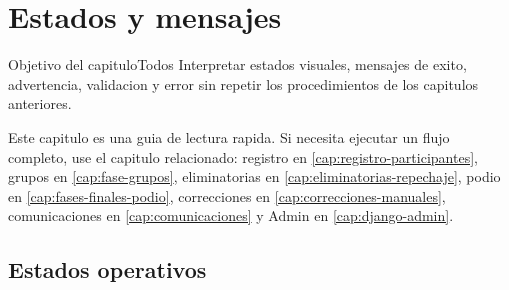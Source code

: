 \chapter{Estados y mensajes}
\label{cap:estados-mensajes}

\begin{procedimiento}{Objetivo del capitulo}{Todos}
Interpretar estados visuales, mensajes de exito, advertencia, validacion y error sin repetir los procedimientos de los capitulos anteriores.
\end{procedimiento}

Este capitulo es una guia de lectura rapida. Si necesita ejecutar un flujo completo, use el capitulo relacionado: registro en \cref{cap:registro-participantes}, grupos en \cref{cap:fase-grupos}, eliminatorias en \cref{cap:eliminatorias-repechaje}, podio en \cref{cap:fases-finales-podio}, correcciones en \cref{cap:correcciones-manuales}, comunicaciones en \cref{cap:comunicaciones} y Admin en \cref{cap:django-admin}.

\section{Estados operativos}


